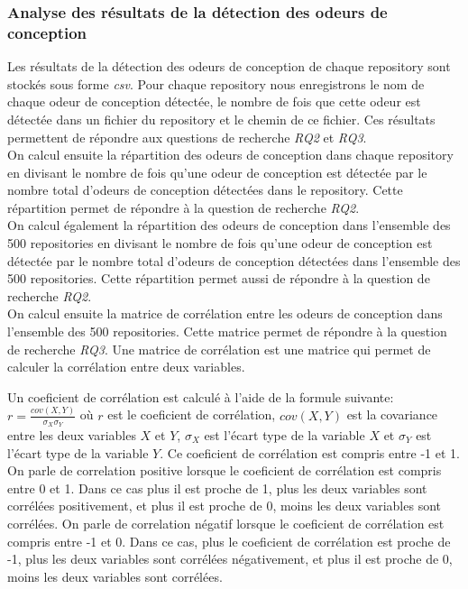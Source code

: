 \subsubsection{Analyse des résultats de la détection des odeurs de conception}
\label{sec:Analyse des résultats de la détection des odeurs de conception}
Les résultats de la détection des odeurs de conception de chaque repository sont
stockés sous forme \emph{csv}. Pour chaque repository nous enregistrons le nom de
chaque odeur de conception détectée, le nombre de fois que cette odeur est
détectée dans un fichier du repository et le chemin de ce fichier. Ces résultats
permettent de répondre aux questions de recherche \emph{RQ2} et \emph{RQ3}.\\
On calcul ensuite la répartition des odeurs de conception dans chaque repository
en divisant le nombre de fois qu'une odeur de conception est détectée par le
nombre total d'odeurs de conception détectées dans le repository. Cette
répartition permet de répondre à la question de recherche \emph{RQ2}.\\ On
calcul également la répartition des odeurs de conception dans l'ensemble des 500
repositories en divisant le nombre de fois qu'une odeur de conception est
détectée par le nombre total d'odeurs de conception détectées dans l'ensemble
des 500 repositories. Cette répartition permet aussi de répondre à la
question de recherche \emph{RQ2}.\\
On calcul ensuite la matrice de corrélation entre les odeurs de conception dans
l'ensemble des 500 repositories. Cette matrice permet de répondre à la question
de recherche \emph{RQ3}. Une matrice de corrélation est une matrice qui permet
de calculer la corrélation entre deux variables.

Un coeficient de corrélation est calculé à l'aide de la formule suivante:  $r =
  \frac{cov(X,Y)}{\sigma_X \sigma_Y}$  où $r$ est le coeficient de corrélation, $cov(X,Y)$ est la covariance entre les
deux variables $X$ et $Y$, $\sigma_X$ est l'écart type de la variable $X$ et
$\sigma_Y$ est l'écart type de la variable $Y$. Ce coeficient de corrélation est
compris entre -1 et 1. On parle de correlation positive lorsque le coeficient de
corrélation est compris entre 0 et 1. Dans ce cas plus il est proche de 1, plus les deux variables sont
corrélées positivement, et plus il est proche de 0, moins les deux variables sont
corrélées. On parle de correlation négatif lorsque le coeficient de corrélation
est compris entre -1 et 0. Dans ce cas, plus le coeficient de corrélation est
proche de -1, plus les deux variables sont corrélées négativement, et plus il
est proche de 0, moins les deux variables sont corrélées.\\



